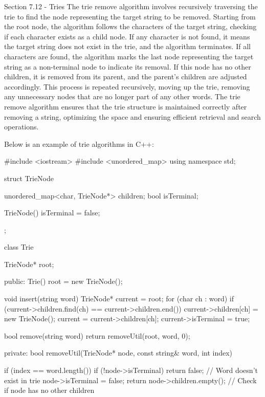 \begin{notes}{Section 7.12 - Tries}
    The trie remove algorithm involves recursively traversing the trie to find the node representing the target string to be removed. Starting from the root node, the algorithm follows the characters of the target string, checking if each character exists as a child node. If any character is not found, it means the target string does not exist 
    in the trie, and the algorithm terminates. If all characters are found, the algorithm marks the last node representing the target string as a non-terminal node to indicate its removal. If this node has no other children, it is removed from its parent, and the parent's children are adjusted accordingly. This process is repeated recursively, 
    moving up the trie, removing any unnecessary nodes that are no longer part of any other words. The trie remove algorithm ensures that the trie structure is maintained correctly after removing a string, optimizing the space and ensuring efficient retrieval and search operations.
    
    \begin{highlight}
        Below is an example of trie algorithms in C++:
    
    \begin{code}[C++]
    #include <iostream>
    #include <unordered_map>
    using namespace std;
    
    struct TrieNode {
        unordered_map<char, TrieNode*> children;
        bool isTerminal;
    
        TrieNode() {
            isTerminal = false;
        }
    };
    
    class Trie {
        TrieNode* root;
    
    public:
        Trie() {
            root = new TrieNode();
        }
    
        void insert(string word) {
            TrieNode* current = root;
            for (char ch : word) {
                if (current->children.find(ch) == current->children.end()) {
                    current->children[ch] = new TrieNode();
                }
                current = current->children[ch];
            }
            current->isTerminal = true;
        }
    
        bool remove(string word) {
            return removeUtil(root, word, 0);
        }
    
    private:
        bool removeUtil(TrieNode* node, const string& word, int index) {
            if (index == word.length()) {
                if (!node->isTerminal) {
                    return false; // Word doesn't exist in trie
                }
                node->isTerminal = false;
                return node->children.empty(); // Check if node has no other children
            }
    
}}
\end{code}
\end{highlight}
\end{notes}
